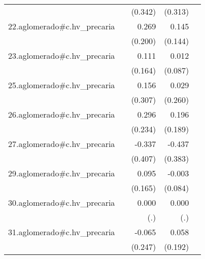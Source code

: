 {\begin{longtable}{l*{4}{D{.}{.}{-1}}}
            &                     &     (0.342)         &     (0.313)         &                     \\
\addlinespace
22.aglomerado#c.hv\_precaria&                     &       0.269         &       0.145         &                     \\
            &                     &     (0.200)         &     (0.144)         &                     \\
\addlinespace
23.aglomerado#c.hv\_precaria&                     &       0.111         &       0.012         &                     \\
            &                     &     (0.164)         &     (0.087)         &                     \\
\addlinespace
25.aglomerado#c.hv\_precaria&                     &       0.156         &       0.029         &                     \\
            &                     &     (0.307)         &     (0.260)         &                     \\
\addlinespace
26.aglomerado#c.hv\_precaria&                     &       0.296         &       0.196         &                     \\
            &                     &     (0.234)         &     (0.189)         &                     \\
\addlinespace
27.aglomerado#c.hv\_precaria&                     &      -0.337         &      -0.437         &                     \\
            &                     &     (0.407)         &     (0.383)         &                     \\
\addlinespace
29.aglomerado#c.hv\_precaria&                     &       0.095         &      -0.003         &                     \\
            &                     &     (0.165)         &     (0.084)         &                     \\
\addlinespace
30.aglomerado#c.hv\_precaria&                     &       0.000         &       0.000         &                     \\
            &                     &         (.)         &         (.)         &                     \\
\addlinespace
31.aglomerado#c.hv\_precaria&                     &      -0.065         &       0.058         &                     \\
            &                     &     (0.247)         &     (0.192)         &                     \\

\end{longtable}}
